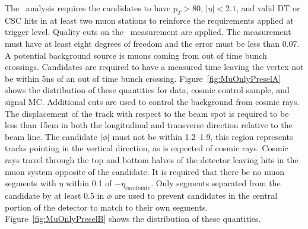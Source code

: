 The \muononly\ analysis requires the candidates to have $p_T > 80$, $|\eta| < 2.1$, and valid DT or CSC hits in at least two muon stations
to reinforce the requirements applied at trigger level. Quality cuts on the
\invbeta\ measurement are applied. The measurement must have at least eight degrees of freedom and the error must be less than 0.07.
A potential background source is muons coming from
out of time bunch crossings. Candidates are required to have a measured time leaving the vertex not be within 5ns of an out of time bunch crossing.
Figure~\ref{fig:MuOnlyPreselA} shows the distribution of these quantities for data, cosmic control sample, and signal MC.
Additional cuts are used to control the background from cosmic rays. The displacement of the track
with respect to the beam spot is required to be less than 15cm in both the longitudinal and transverse direction relative to the beam line. 
The candidate $|\phi|$ must not be within 1.2--1.9, this region represents tracks pointing in the vertical
direction, as is expected of cosmic rays. Cosmic rays travel through the top and bottom halves of the detector leaving hits in the muon system opposite of the candidate.
It is required that  there be no muon segments with $\eta$ within 0.1 of $-\eta_{candidate}$. Only segments separated from the candidate by at least 0.5 in $\phi$
are used to prevent candidates in the central portion of the detector to match to their own segments.
Figure~\ref{fig:MuOnlyPreselB} shows the distribution of these quantities.

